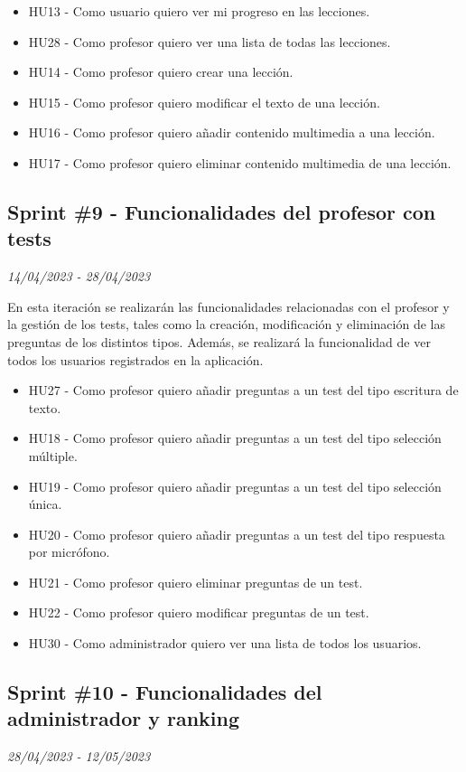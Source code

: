 \begin{itemize}
    \item HU13 - Como usuario quiero ver mi progreso en las lecciones.
    \item HU28 - Como profesor quiero ver una lista de todas las lecciones. 
    \item HU14 - Como profesor quiero crear una lección.
    \item HU15 - Como profesor quiero modificar el texto de una lección.
    \item HU16 - Como profesor quiero añadir contenido multimedia a una lección.
    \item HU17 - Como profesor quiero eliminar contenido multimedia de una lección.
\end{itemize}

\subsection{Sprint \#9 - Funcionalidades del profesor con tests}
\textit{14/04/2023   -   28/04/2023}

En esta iteración se realizarán las funcionalidades relacionadas con el profesor y la gestión de los tests, tales como la creación, modificación y eliminación de las preguntas
de los distintos tipos. Además, se realizará la funcionalidad de ver todos los usuarios registrados en la aplicación.


\begin{itemize}
    \item HU27 - Como profesor quiero añadir preguntas a un test del tipo escritura de texto.
    \item HU18 - Como profesor quiero añadir preguntas a un test del tipo selección múltiple.
    \item HU19 - Como profesor quiero añadir preguntas a un test del tipo selección única.
    \item HU20 - Como profesor quiero añadir preguntas a un test del tipo respuesta por micrófono. 
    \item HU21 - Como profesor quiero eliminar preguntas de un test.
    \item HU22 - Como profesor quiero modificar preguntas de un test.
    \item HU30 - Como administrador quiero ver una lista de todos los usuarios.
\end{itemize}

\newpage

\subsection{Sprint \#10 - Funcionalidades del administrador y ranking}
\textit{28/04/2023   -   12/05/2023}

